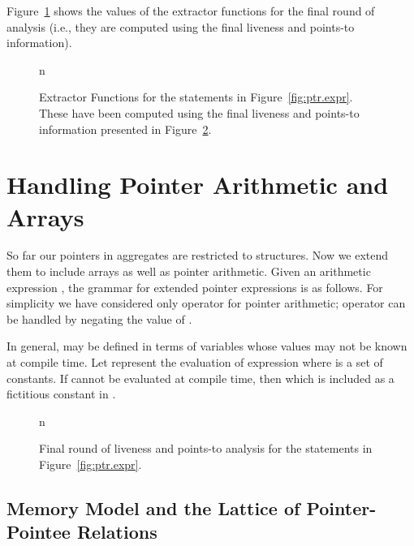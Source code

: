 \documentclass[a4paper,11pt,fleqn]{article}
\newcommand{\const}{\text{\sf\em C\/}\xspace}
\begin{document}
Figure~\ref{fig:extractor.fn.exmp} shows the values of the extractor functions for the final round of analysis
(i.e., they are computed using the final liveness and points-to information).

\begin{figure}[t]
\begin{center}
n
\end{center}

\caption{Extractor Functions for the statements in
Figure~\protect\ref{fig:ptr.expr}. These have been computed using the final
liveness and points-to information presented in 
Figure~\protect\ref{fig:data.flow.values}.}
\label{fig:extractor.fn.exmp}
\end{figure}

\section{Handling Pointer Arithmetic and Arrays}
\label{sec:lfcpa.arrays}

So far our pointers in aggregates are restricted to structures. Now we
extend them to include arrays as well as pointer arithmetic. Given an
arithmetic expression \text{}, the grammar for extended
pointer expressions is as follows. For simplicity we have considered only
 operator for pointer arithmetic;  operator can be handled by negating the
value of .

In general, \text{} may be defined in terms of variables whose values may
not be known at compile time.
Let \text{} represent the evaluation of
expression  where \const is a set of constants. If  cannot be evaluated at compile time,  then
\text{} which
is included as a fictitious constant in \const. 

\begin{figure}[t]
\begin{center}
n
\end{center}

\caption{Final round of liveness and points-to analysis for the statements in
Figure~\protect\ref{fig:ptr.expr}.}
\label{fig:data.flow.values}
\end{figure}

\subsection{Memory Model and the Lattice of Pointer-Pointee Relations}
\label{sec:mem.model.array}
\end{document}
